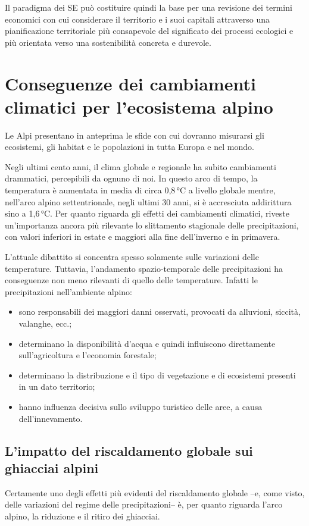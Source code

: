 \documentclass[12pt,a4paper]{article}
\begin{document}
	Il paradigma dei SE può costituire quindi la base per una revisione dei termini economici con cui considerare il territorio e i suoi capitali attraverso una  pianificazione territoriale più consapevole del significato dei processi ecologici e più orientata verso una sostenibilità concreta e durevole.
	
	
	\section{Conseguenze dei cambiamenti climatici per l'ecosistema alpino \cite{LeAlpi}}
	
	Le Alpi presentano in anteprima le sfide con cui dovranno misurarsi gli ecosistemi, gli habitat e le popolazioni in tutta Europa e nel mondo.
	
	Negli ultimi cento anni, il clima globale e regionale ha subito cambiamenti drammatici, percepibili da ognuno di noi. In questo arco di tempo, la temperatura è aumentata in media di circa 0,8\,°C a livello globale mentre, nell'arco alpino settentrionale, negli ultimi 30 anni, si è accresciuta addirittura sino a 1,6\,°C. Per quanto riguarda gli effetti dei cambiamenti climatici, riveste un'importanza ancora più rilevante lo slittamento stagionale delle precipitazioni, con valori inferiori in estate e maggiori alla fine dell'inverno e in primavera.
	
	L'attuale dibattito si concentra spesso solamente sulle variazioni delle temperature. Tuttavia, l'andamento spazio-temporale delle precipitazioni ha conseguenze non meno rilevanti di quello delle temperature. Infatti le precipitazioni nell'ambiente alpino:
		
	\begin{itemize}
		\item sono responsabili dei maggiori danni osservati, provocati da alluvioni, siccità, valanghe, ecc.;
		\item determinano la disponibilità d'acqua e quindi influiscono direttamente sull'agricoltura e l'economia forestale;
		\item determinano la distribuzione e il tipo di vegetazione e di ecosistemi presenti in un dato territorio;
		\item hanno influenza decisiva sullo sviluppo turistico delle aree, a causa dell'innevamento.
	\end{itemize}
	
	\subsection{L'impatto del riscaldamento globale sui ghiacciai alpini}
		Certamente uno degli effetti più evidenti del riscaldamento globale --e, come visto, delle variazioni del regime delle precipitazioni-- è, per quanto riguarda l'arco alpino, la riduzione e il ritiro dei ghiacciai.
		
\end{document}

